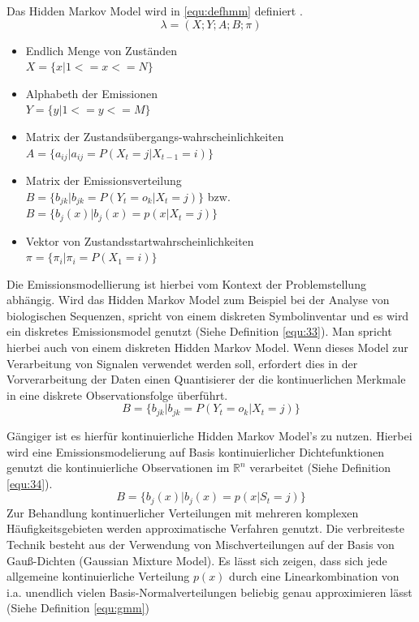 Das Hidden Markov Model wird in \ref{equ:defhmm} definiert \cite[68]{mmmFink}. 
\begin{equation}
\label{equ:defhmm}
\lambda = (X;Y;A;B;\pi)
\end{equation}
\begin{itemize}
     \item Endlich Menge von Zuständen \\
           \( X = \{ x | 1 <= x <= N \} \)
     \item Alphabeth der Emissionen \\
           \( Y = \{ y | 1 <= y <= M \} \)
     \item Matrix der Zustandsübergangs-wahrscheinlichkeiten \\
           \( A = \{ a_{ij} | a_{ij} = P(X_t = j | X_{t-1} = i) \} \)
     \item Matrix der Emissionsverteilung \\
           \( B = \{ b_{jk} | b_{jk} = P(Y_t = o_k | X_t = j) \} \) bzw. \\
           \( B = \{ b_{j}(x) | b_{j}(x) = p(x|X_t = j) \} \)
     \item Vektor von Zustandsstartwahrscheinlichkeiten \\
           \( \pi = \{ \pi_i | \pi_i = P(X_1 = i) \} \) 
\end{itemize}


Die Emissionsmodellierung ist hierbei vom Kontext der Problemstellung abhängig. Wird das Hidden Markov Model zum Beispiel bei der Analyse von biologischen Sequenzen, spricht von einem diskreten Symbolinventar und es  wird ein diskretes Emissionsmodel genutzt (Siehe Definition \ref{equ:33}). Man spricht hierbei auch von einem diskreten Hidden Markov Model. Wenn dieses Model zur Verarbeitung von Signalen verwendet werden soll, erfordert dies in der Vorverarbeitung der Daten einen Quantisierer der die kontinuerlichen Merkmale in eine diskrete Observationsfolge überführt. 
\begin{equation}
\label{equ:33}
B = \{ b_{jk} | b_{jk} = P(Y_t = o_k | X_t = j) \}
\end{equation}


Gängiger ist es hierfür kontinuierliche Hidden Markov Model's zu nutzen. Hierbei wird eine Emissionsmodelierung auf Basis kontinuierlicher Dichtefunktionen genutzt die kontinuierliche Observationen im \(\mathbb{R}^n\) verarbeitet (Siehe Definition \ref{equ:34}).
\begin{equation}
\label{equ:34}
B =\{ b_{j}(x) | b_{j}(x) = p(x|S_t = j) \}
\end{equation}
Zur Behandlung kontinuerlicher Verteilungen mit mehreren komplexen Häufigkeitsgebieten werden approximatische Verfahren genutzt. Die verbreiteste Technik besteht aus der Verwendung von Mischverteilungen auf der Basis von Gauß-Dichten (Gaussian Mixture Model). Es lässt sich  zeigen, dass sich jede allgemeine kontinuierliche Verteilung \(p(x)\) durch eine Linearkombination von i.a. unendlich vielen Basis-Normalverteilungen beliebig genau approximieren lässt \cite[69]{mmmFink} (Siehe Definition \ref{equ:gmm})
 
